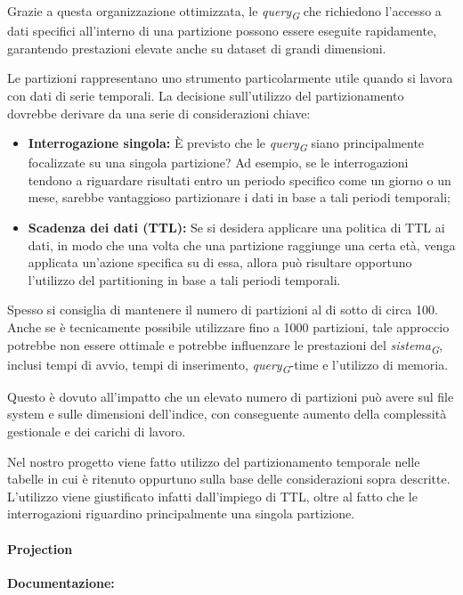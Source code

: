 Grazie a questa organizzazione ottimizzata, le \textit{query}\textsubscript{\textit{G}} che richiedono l'accesso a dati specifici all'interno di una partizione possono essere eseguite rapidamente, garantendo prestazioni elevate anche su dataset di grandi dimensioni.

Le partizioni rappresentano uno strumento particolarmente utile quando si lavora con dati di serie temporali. La decisione sull'utilizzo del partizionamento dovrebbe derivare da una serie di considerazioni chiave:

\begin{itemize}
	\item \textbf{Interrogazione singola:} È previsto che le \textit{query}\textsubscript{\textit{G}} siano principalmente focalizzate su una singola partizione? Ad esempio, se le interrogazioni tendono a riguardare risultati entro un periodo specifico come un giorno o un mese, sarebbe vantaggioso partizionare i dati in base a tali periodi temporali;
	\item \textbf{Scadenza dei dati (TTL):} Se si desidera applicare una politica di TTL ai dati, in modo che una volta che una partizione raggiunge una certa età, venga applicata un'azione specifica su di essa, allora può risultare opportuno l'utilizzo del partitioning in base a tali periodi temporali.
\end{itemize}

Spesso si consiglia di mantenere il numero di partizioni al di sotto di circa 100. Anche se è tecnicamente possibile utilizzare fino a 1000 partizioni, tale approccio potrebbe non essere ottimale e potrebbe influenzare le prestazioni del \textit{sistema}\textsubscript{\textit{G}}, inclusi tempi di avvio, tempi di inserimento, \textit{query}\textsubscript{\textit{G}}-time e l'utilizzo di memoria.

Questo è dovuto all'impatto che un elevato numero di partizioni può avere sul file system e sulle dimensioni dell'indice, con conseguente aumento della complessità gestionale e dei carichi di lavoro.

Nel nostro progetto viene fatto utilizzo del partizionamento temporale nelle tabelle in cui è ritenuto oppurtuno sulla base delle considerazioni sopra descritte. L'utilizzo viene giustificato infatti dall'impiego di TTL, oltre al fatto che le interrogazioni riguardino principalmente una singola partizione.
    
\paragraph{Projection}\label{sec:projections}
\textbf{Documentazione:}


